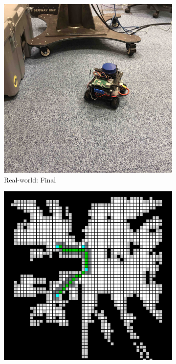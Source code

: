 \begin{figure}[htb]
  \begin{subfigure}[b]{0.32\linewidth}
    \includegraphics[width=\linewidth]{images/real/robo/final}
     \caption{Real-world: Final}
  \end{subfigure}
  \hfill
  \begin{subfigure}[b]{0.32\linewidth}
    \includegraphics[width=\linewidth]{images/real/sys/final_2.png}

\end{subfigure}
\end{figure}
